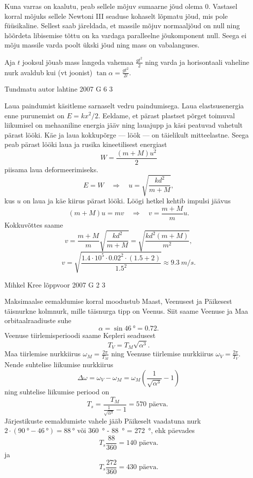 \documentclass[11pt, twoside]{article}
\begin{document}
{{Kuna varras on kaalutu, peab sellele mõjuv sumaarne jõud olema \num{0}. Vastasel korral mõjuks sellele Newtoni III seaduse kohaselt lõpmatu jõud, mis pole füüsikaline. Sellest saab järeldada, et massile mõjuv normaaljõud on null ning hõõrdeta libisemise tõttu on ka vardaga paralleelne jõukomponent null. Seega ei mõju massile varda poolt ükski jõud ning mass on vabalanguses. 

Aja $t$ jooksul jõuab mass langeda vahemaa $\frac{gt^2}{2}$ ning varda ja horisontaali vaheline nurk avaldub kui (vt joonist) $\tan\alpha = \frac{gt^2}{2l}$.
\fi
}

{Tundmatu autor} %
{lahtine} %
{2007} %
{G 6} %
{3} %
{

\ifSolution
Laua paindumist käsitleme sarnaselt vedru paindumisega. Laua elastsusenergia enne purunemist on $E = kx^2/2$. Eeldame, et pärast plastset põrget toimuval liikumisel on mehaaniline energia jääv ning lauajupp ja käsi peatuvad vahetult pärast lööki. Käe ja laua kokkupõrge --- löök --- on täielikult mitteelastne. Seega peab pärast lööki laua ja rusika kineetilisest energiast
\[
W = \frac{(m+M)u^2}{2}
\]
piisama laua deformeerimiseks.
\[
E=W \quad \Rightarrow \quad u=\sqrt{\frac{k d^{2}}{m+M}},
\]
kus $u$ on laua ja käe kiirus pärast lööki. Löögi hetkel kehtib impulsi jäävus
\[
(m+M) u=m v \quad \Rightarrow \quad v=\frac{m+M}{m} u.
\]
Kokkuvõttes saame
\[
	v=\frac{m+M}{m} \sqrt{\frac{k d^{2}}{m+M}}=\sqrt{\frac{k d^{2}(m+M)}{m^{2}}},
\]
\[
	 v=\sqrt{\frac{\num{1,4} \cdot 10^{5} \cdot \num{0,02}^{2} \cdot(\num{1,5}+2)}{\num{1,5}^{2}}} \approx \SI{9,3}{m/s}.
\]
\fi
}

{Mihkel Kree} %
{lõppvoor} %
{2007} %
{G 2} %
{3} %
{

\ifSolution
\osa Maksimaalse eemaldumise korral moodustub Maast, Veenusest ja Päikesest täisnurkne kolmnurk, mille täisnurga tipp on Veenus. Siit saame Veenuse ja Maa orbitaalraadiuste suhe
\[
\alpha = \sin \SI{46}{\degree} = \num{0,72}.
\]
\osa Veenuse tiirlemisperioodi saame Kepleri seadusest
\[
T_V = T_M \sqrt{\alpha^3}.
\]
Maa tiirlemise nurkkiirus $\omega_M = \frac{2\pi}{T_M}$ ning Veenuse tiirlemise nurkkiirus $\omega_V = \frac{2\pi}{T_V}$. Nende suhtelise liikumise nurkkiirus
\[
\Delta \omega=\omega_{V}-\omega_{M}=\omega_{M}\left(\frac{1}{\sqrt{\alpha^{3}}}-1\right)
\]
ning suhtelise liikumise periood on
\[
T_{s}=\frac{T_{M}}{\frac{1}{\sqrt{\alpha^{3}}}-1}=570 \text { päeva. }
\]
Järjestikuste eemaldumiste vahele jääb Päikeselt vaadatuna nurk $2\cdot (\SI{90}{\degree} - \SI{46}{\degree}) = \SI{88}{\degree}$ või \SI{360}{\degree} - \SI{88}{\degree} = \SI{272}{\degree}, ehk päevades 
\[
T_s \frac{88}{360} = 140\text{ päeva.}
\]
ja 
\[
T_s \frac{272}{360} = 430\text{ päeva.}
\]
\fi
}

}
\end{document}
